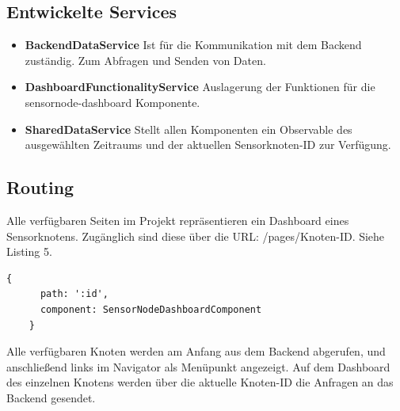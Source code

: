 \subsection{Entwickelte Services}

\begin{itemize}
 \item \textbf{BackendDataService} Ist für die Kommunikation mit dem Backend zuständig. Zum Abfragen und Senden von Daten.
 \item \textbf{DashboardFunctionalityService} Auslagerung der Funktionen für die sensornode-dashboard Komponente.
 \item \textbf{SharedDataService} Stellt allen Komponenten ein Observable des ausgewählten Zeitraums und der aktuellen Sensorknoten-ID zur Verfügung.
\end{itemize}
\subsection{Routing}
Alle verfügbaren Seiten im Projekt repräsentieren ein Dashboard eines Sensorknotens.
Zugänglich sind diese über die URL: /pages/{Knoten-ID}. Siehe Listing 5.
\begin{lstlisting}[caption={Knoten-ID Routing},captionpos=b,showstringspaces=false, basicstyle=\small]
    {
      path: ':id',
      component: SensorNodeDashboardComponent
    }
\end{lstlisting}
Alle verfügbaren Knoten werden am Anfang aus dem Backend abgerufen, und anschließend links im Navigator als Menüpunkt angezeigt. Auf dem Dashboard des einzelnen Knotens werden über die aktuelle Knoten-ID die Anfragen an das Backend gesendet.